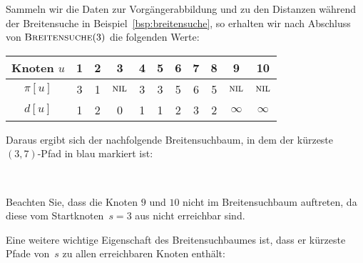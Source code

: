 \begin{bsp}
Sammeln wir die Daten zur Vorgängerabbildung und zu den Distanzen während der Breitensuche in Beispiel~\ref{bsp:breitensuche}, so erhalten wir nach Abschluss von $\mathop{\text{\textsc{Breitensuche}}}(3)$ die folgenden Werte:

\begin{table}[H]
\centering
\begin{tabular}{|c|c|c|c|c|c|c|c|c|c|c|}
\hline
\textbf{Knoten $u$}        & \textbf{1} & \textbf{2} & \textbf{3} & \textbf{4} & \textbf{5} & \textbf{6} & \textbf{7} & \textbf{8} & \textbf{9} & \textbf{10} \\ \hline
\textbf{$\pi[u]$}    & 3          & 1          & $\mathop{\text{\textsc{nil}}}$          & 3          & 3          & 5          & 6         & 5         & $\mathop{\text{\textsc{nil}}}$         & $\mathop{\text{\textsc{nil}}}$          \\ \hline
\textbf{$d[u]$} & 1          & 2          & 0         & 1          & 1         & 2         & 3         & 2         & $\infty$         & $\infty$          \\ \hline
\end{tabular}
\end{table}

Daraus ergibt sich der nachfolgende Breitensuchbaum, in dem der kürzeste $(3,7)$-Pfad in blau markiert ist:

\hfill
{}
\hfill\,

Beachten Sie, dass die Knoten $9$ und $10$ nicht im Breitensuchbaum auftreten, da diese vom Startknoten~$s=3$ aus nicht erreichbar sind.
\end{bsp}

\begin{bem}
Eine weitere wichtige Eigenschaft des Breitensuchbaumes ist, dass er kürzeste Pfade von~$s$ zu allen erreichbaren Knoten enthält:
\end{bem}

